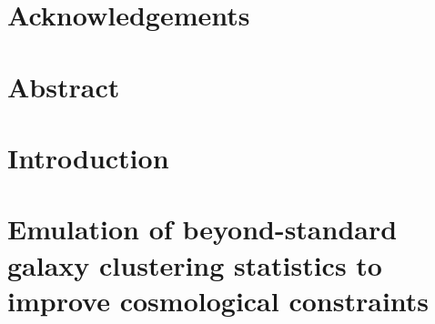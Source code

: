 \documentclass[12pt,oneside,letterpaper]{report}
\begin{document}
\chapter*{Acknowledgements}

%

\newpage


\chapter*{Abstract}



\newpage


\tableofcontents


\cleardoublepage
{}
{}
\listoffigures
\newpage


\cleardoublepage
{}
{}
\listoftables
\newpage





\setcounter{chapter}{-1}

\chapter{Introduction}
\setcounter{section}{-1}
\label{chp-introduction}


\chapter{Emulation of beyond-standard galaxy clustering statistics to improve cosmological constraints}
\setcounter{section}{-1}
\label{chp-aemulus}
%
\end{document}

